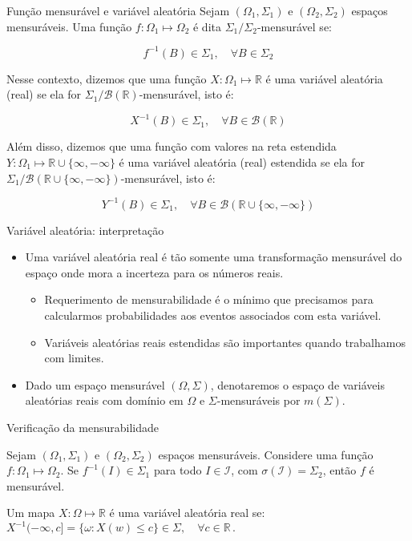 \documentclass[11pt]{beamer}
\begin{document}
\begin{frame}{Função mensurável e variável aleatória}
Sejam $(\Omega_1, \Sigma_1)$ e $(\Omega_2, \Sigma_2)$ espaços mensuráveis.  Uma função $f: \Omega_1 \mapsto \Omega_2$ é dita $\Sigma_1 \slash \Sigma_2$-mensurável se: 

$$f^{-1}(B) \in \Sigma_1, \quad \forall B \in \Sigma_2$$

Nesse contexto, dizemos que uma função $X:  \Omega_1 \mapsto \mathbb{R}$ é uma {\color{red}variável aleatória (real)} se ela for $\Sigma_1/\mathcal{B}(\mathbb{R})$-mensurável, isto é:

$$X^{-1}(B) \in  \Sigma_1, \quad \forall B \in \mathcal{B}(\mathbb{R})$$

Além disso, dizemos que uma função com valores na reta estendida $Y:  \Omega_1 \mapsto \mathbb{R}\cup\{\infty,-\infty\}$ é uma {\color{red}variável aleatória (real) estendida} se ela for $\Sigma_1/\mathcal{B}(\mathbb{R} \cup\{\infty,-\infty\})$-mensurável, isto é:

$$Y^{-1}(B) \in  \Sigma_1, \quad \forall B \in \mathcal{B}(\mathbb{R}\cup\{\infty,-\infty\})$$
\end{frame}

\begin{frame}{Variável aleatória: interpretação}
	\begin{itemize}
		\item Uma variável aleatória real é tão somente uma transformação mensurável do espaço onde mora a incerteza para os números reais.
		\begin{itemize}
			\item Requerimento de mensurabilidade é o mínimo que precisamos para calcularmos probabilidades aos eventos associados com esta variável.
			\item Variáveis aleatórias reais estendidas são importantes quando trabalhamos com limites.
		\end{itemize}
		\item Dado um espaço mensurável $(\Omega, \Sigma)$, denotaremos o espaço de variáveis aleatórias reais com domínio em $\Omega$ e $\Sigma$-mensuráveis por $m(\Sigma)$.
	\end{itemize}
\end{frame}

\begin{frame}{Verificação da mensurabilidade}
\begin{lemma}
	Sejam $(\Omega_1, \Sigma_1)$ e $(\Omega_2, \Sigma_2)$ espaços mensuráveis. Considere uma função $f: \Omega_1 \mapsto \Omega_2$. Se $f^{-1}(I) \in \Sigma_1$ para todo $I \in \mathcal{I}$, com $\sigma(\mathcal{I}) = \Sigma_2$, então $f$ é mensurável.
\end{lemma}
\begin{corollary}
	Um mapa $X: \Omega \mapsto \mathbb{R}$ é uma variável aleatória real se:
	$X^{-1}(-\infty,c] = \{\omega : X(w) \leq c\} \in \Sigma, \quad \forall c \in \mathbb{R} \, .$
\end{corollary}
\end{frame}
\end{document}
